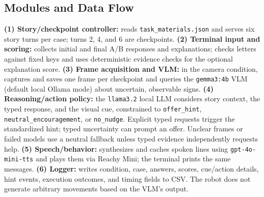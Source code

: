 \documentclass[conference]{IEEEtran}
\begin{document}
\subsection{Modules and Data Flow}
\textbf{(1) Story/checkpoint controller:} reads \texttt{task\_materials.json} and serves six story turns per case; turns 2, 4, and 6 are checkpoints. \textbf{(2) Terminal input and scoring:} collects initial and final A/B responses and explanations; checks letters against fixed keys and uses deterministic evidence checks for the optional explanation score. \textbf{(3) Frame acquisition and VLM:} in the camera condition, captures and saves one frame per checkpoint and queries the \texttt{gemma3:4b} VLM (default local Ollama mode) about uncertain, observable signs. \textbf{(4) Reasoning/action policy:} the \texttt{llama3.2} local LLM considers story context, the typed response, and the visual cue, constrained to \texttt{offer\_hint}, \texttt{neutral\_encouragement}, or \texttt{no\_nudge}. Explicit typed requests trigger the standardized hint; typed uncertainty can prompt an offer. Unclear frames or failed models use a neutral fallback unless typed evidence independently requests help. \textbf{(5) Speech/behavior:} synthesizes and caches spoken lines using \texttt{gpt-4o-mini-tts} and plays them via Reachy Mini; the terminal prints the same messages. \textbf{(6) Logger:} writes condition, case, answers, scores, cue/action details, hint events, execution outcomes, and timing fields to CSV. The robot does not generate arbitrary movements based on the VLM's output.
\end{document}
